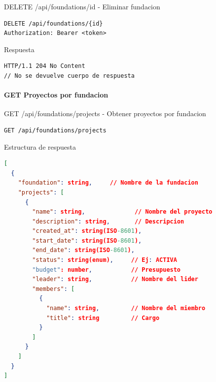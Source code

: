 \documentclass[11pt,a4paper]{article}
\begin{document}
\begin{center}
	\begin{minipage}{\textwidth}
		\begin{codebox}{DELETE /api/foundations/{id} - Eliminar fundacion}
			\begin{lstlisting}[language=HTTP]
DELETE /api/foundations/{id}
Authorization: Bearer <token>
\end{lstlisting}
		\end{codebox}
	\end{minipage}
\end{center}

\begin{center}
	\begin{minipage}{\textwidth}
		\begin{codebox}{Respuesta}
			\begin{lstlisting}[language=HTTP]
HTTP/1.1 204 No Content
// No se devuelve cuerpo de respuesta
\end{lstlisting}
		\end{codebox}
	\end{minipage}
\end{center}

\paragraph{GET Proyectos por fundacion}

\begin{center}
	\begin{minipage}{\textwidth}
		\begin{codebox}{GET /api/foundations/projects - Obtener proyectos por fundacion}
			\begin{lstlisting}[language=HTTP]
GET /api/foundations/projects
\end{lstlisting}
		\end{codebox}
	\end{minipage}
\end{center}

\begin{center}
	\begin{minipage}{\textwidth}
		\begin{codebox}{Estructura de respuesta}
			\begin{lstlisting}[language=json]
[
  {
    "foundation": string,     // Nombre de la fundacion
    "projects": [
      {
        "name": string,              // Nombre del proyecto
        "description": string,       // Descripcion
        "created_at": string(ISO-8601),
        "start_date": string(ISO-8601),
        "end_date": string(ISO-8601),
        "status": string(enum),     // Ej: ACTIVA
        "budget": number,           // Presupuesto
        "leader": string,           // Nombre del lider
        "members": [
          {
            "name": string,         // Nombre del miembro
            "title": string         // Cargo
          }
        ]
      }
    ]
  }
]
\end{lstlisting}
		\end{codebox}
	\end{minipage}
\end{center}
\end{document}
